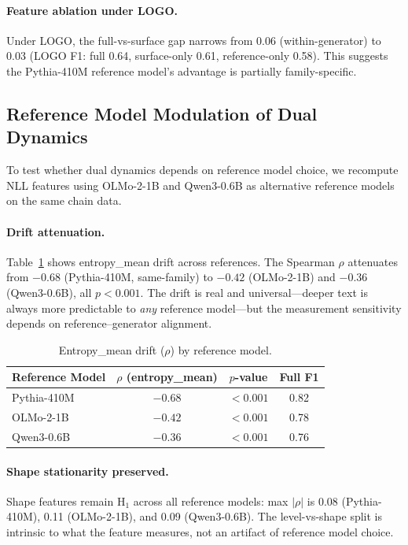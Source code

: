 \documentclass[letterpaper]{article}
\begin{document}
\paragraph{Feature ablation under LOGO.}
Under LOGO, the full-vs-surface gap narrows from 0.06 (within-generator) to 0.03 (LOGO F1: full 0.64, surface-only 0.61, reference-only 0.58).
This suggests the Pythia-410M reference model's advantage is partially family-specific.

\subsection{Reference Model Modulation of Dual Dynamics}
\label{sec:cross_ref}

To test whether dual dynamics depends on reference model choice, we recompute NLL features using OLMo-2-1B and Qwen3-0.6B as alternative reference models on the same chain data.

\paragraph{Drift attenuation.}
Table~\ref{tab:ref_drift} shows entropy\_mean drift across references.
The Spearman $\rho$ attenuates from $-0.68$ (Pythia-410M, same-family) to $-0.42$ (OLMo-2-1B) and $-0.36$ (Qwen3-0.6B), all $p{<}0.001$.
The drift is real and universal---deeper text is always more predictable to \emph{any} reference model---but the measurement sensitivity depends on reference--generator alignment.

\begin{table}[h]
\centering
\caption{Entropy\_mean drift ($\rho$) by reference model.}
\label{tab:ref_drift}
\begin{tabular}{lccc}
\toprule
Reference Model & $\rho$ (entropy\_mean) & $p$-value & Full F1 \\
\midrule
Pythia-410M & $-0.68$ & ${<}0.001$ & 0.82 \\
OLMo-2-1B & $-0.42$ & ${<}0.001$ & 0.78 \\
Qwen3-0.6B & $-0.36$ & ${<}0.001$ & 0.76 \\
\bottomrule
\end{tabular}
\end{table}

\paragraph{Shape stationarity preserved.}
Shape features remain H$_1$ across all reference models: max $|\rho|$ is 0.08 (Pythia-410M), 0.11 (OLMo-2-1B), and 0.09 (Qwen3-0.6B).
The level-vs-shape split is intrinsic to what the feature measures, not an artifact of reference model choice.
\end{document}
